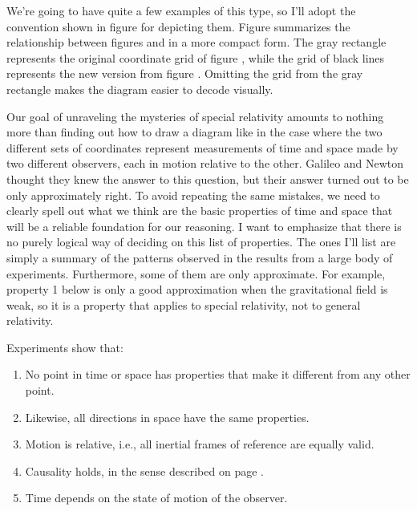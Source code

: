 We're going to
have quite a few examples of this type, so I'll adopt the convention shown in figure 
for depicting them. Figure  summarizes the relationship between figures
 and  in a more compact form. The gray rectangle represents the
original coordinate grid of figure , while the grid of black lines represents the new version
from figure . Omitting the grid from the gray rectangle makes the diagram easier
to decode visually.

Our goal of unraveling the mysteries of special relativity amounts to nothing more than finding out how to
draw a diagram like  in the case where the two different sets of coordinates represent
measurements of time and space made by two different observers, each in motion relative to the other.
Galileo and Newton thought they knew the answer to this question, but their answer turned out to be
only approximately right. To avoid repeating the same mistakes, we need to clearly spell out what we think are
the basic properties of time and space that will be a reliable foundation for our reasoning. I want to emphasize
that there is no purely logical way of deciding on this list of properties. The ones I'll list are simply a summary of the
patterns observed in the results
from a large body of experiments. Furthermore, some of them are only approximate. For example, property 1 below
is only a good approximation when the gravitational field is weak, so it is a property that applies to
special relativity, not to general relativity.

Experiments show that:\label{spacetime-properties}
\begin{enumerate}
\item No point in time or space has properties that make it different from any other point.
\item Likewise, all directions in space have the same properties.
\item Motion is relative, i.e., all inertial frames of reference are equally valid.
\item Causality holds, in the sense described on page \pageref{causality-defined}.
\item Time depends on the state of motion of the observer.
\end{enumerate}

